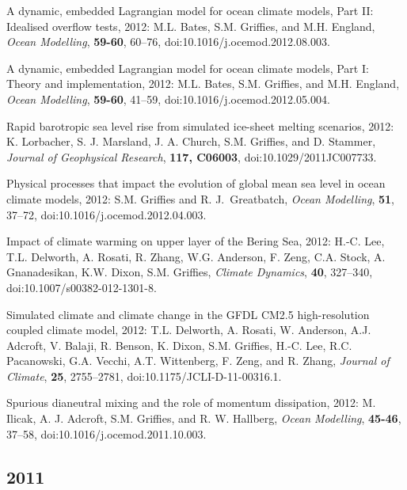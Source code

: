 \begin{etaremune}
\item A dynamic, embedded Lagrangian model for ocean climate models,  Part II: Idealised overflow tests, 2012: M.L. Bates, S.M. Grif\/f\/ies, and M.H. England, {\it Ocean Modelling}, {\bf
    59-60}, 60--76, doi:10.1016/j.ocemod.2012.08.003.

\item A dynamic, embedded Lagrangian model for ocean climate models, Part I: Theory and implementation, 2012: M.L. Bates, S.M. Grif\/f\/ies, and M.H. England, {\it Ocean Modelling}, {\bf  59-60}, 41--59, doi:10.1016/j.ocemod.2012.05.004.

\item Rapid barotropic sea level rise from simulated ice-sheet melting  scenarios, 2012: K. Lorbacher, S. J. Marsland, J. A. Church, S.M. Grif\/f\/ies, and D. Stammer, {\it Journal of Geophysical Research}, {\bf 117, C06003}, doi:10.1029/2011JC007733.

\item Physical processes that impact the evolution of global mean sea  level in ocean climate models, 2012: S.M. Grif\/f\/ies and R. J.\  Greatbatch, {\it Ocean Modelling}, {\bf 51}, 37--72,  doi:10.1016/j.ocemod.2012.04.003.

\item Impact of climate warming on upper layer of the Bering Sea, 2012: H.-C. Lee, T.L. Delworth, A. Rosati, R. Zhang, W.G. Anderson,  F. Zeng, C.A. Stock, A. Gnanadesikan, K.W. Dixon, S.M. Grif\/f\/ies, {\it Climate Dynamics}, {\bf 40}, 327–340,
\\  doi:10.1007/s00382-012-1301-8.

\item Simulated climate and climate change in the GFDL CM2.5 high-resolution coupled climate model, 2012: T.L. Delworth,  A. Rosati, W. Anderson, A.J. Adcroft, V. Balaji, R. Benson,  K. Dixon, S.M. Grif\/f\/ies, H.-C. Lee, R.C. Pacanowski,  G.A. Vecchi, A.T. Wittenberg, F. Zeng, and R. Zhang, {\it Journal of  Climate}, {\bf 25}, 2755--2781, doi:10.1175/JCLI-D-11-00316.1.

\item Spurious dianeutral mixing and the role of momentum dissipation, 2012: M. Ilicak, A. J. Adcroft, S.M. Grif\/f\/ies, and  R. W. Hallberg, {\it Ocean Modelling}, {\bf 45-46}, 37--58,  doi:10.1016/j.ocemod.2011.10.003.

\subsection*{\sc \color{Maroon} 2011}


\end{etaremune}
